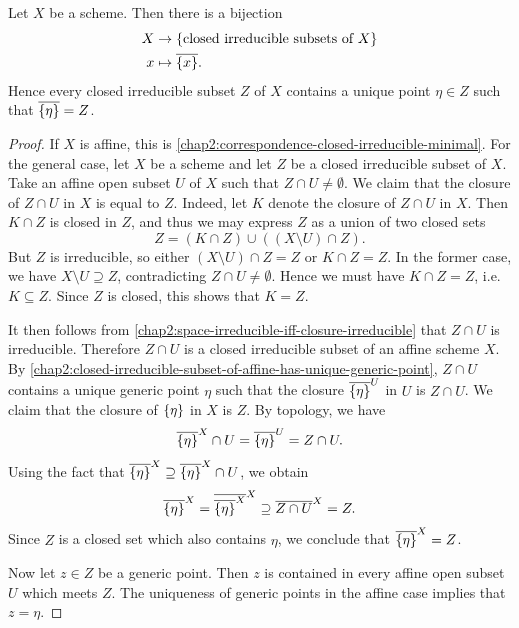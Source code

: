 \documentclass[12pt]{book}
\theoremstyle{definition}
\DeclarePairedDelimiter{\Set}{\lbrace}{\rbrace}
\begin{document}
	\begin{proposition}
		Let $X$ be a scheme. Then there is a bijection
		\begin{align*}
			X & \to \Set*{\text{closed irreducible subsets of $X$}} \\
			x & \mapsto \overline{\Set{x}}.
		\end{align*}
		Hence every closed irreducible subset $Z$ of $X$ contains a unique point $\eta \in Z$ such that $\overline{\Set{\eta}} = Z$.
	\end{proposition}
	
	\begin{proof}
		If $X$ is affine, this is \cref{chap2:correspondence-closed-irreducible-minimal}. For the general case, let $X$ be a scheme and let $Z$ be a closed irreducible subset of $X$. Take an affine open subset $U$ of $X$ such that $Z \cap U \neq \emptyset$. We claim that the closure of $Z \cap U$ in $X$ is equal to $Z$. Indeed, let $K$ denote the closure of $Z \cap U$ in $X$. Then $K \cap Z$ is closed in $Z$, and thus we may express $Z$ as a union of two closed sets
		\begin{equation*}
			Z = (K \cap Z) \cup ((X \setminus U) \cap Z).
		\end{equation*}
		But $Z$ is irreducible, so either $(X \setminus U) \cap Z = Z$ or $K \cap Z = Z$. In the former case, we have $X \setminus U \supseteq Z$, contradicting $Z \cap U \neq \emptyset$. Hence we must have $K \cap Z = Z$, i.e.~$K \subseteq Z$. Since $Z$ is closed, this shows that $K = Z$.
		
		It then follows from \cref{chap2:space-irreducible-iff-closure-irreducible} that $Z \cap U$ is irreducible. Therefore $Z \cap U$ is a closed irreducible subset of an affine scheme $X$. By \cref{chap2:closed-irreducible-subset-of-affine-has-unique-generic-point}, $Z \cap U$ contains a unique generic point $\eta$ such that the closure $\overline{\Set{\eta}}^U$ in $U$ is $Z \cap U$. We claim that the closure of $\Set{\eta}$ in $X$ is $Z$. By topology, we have
		\begin{equation*}
			\overline{\Set{\eta}}^{X} \cap U = \overline{\Set{\eta}}^{U} = Z \cap U.
		\end{equation*}
		Using the fact that $\overline{\Set{\eta}}^{X} \supseteq \overline{\Set{\eta}}^{X} \cap U$, we obtain
		\begin{equation*}
			\overline{\Set{\eta}}^X = \overline{\overline{\Set{\eta}}^{X}}^X \supseteq  \overline{Z \cap U}^X = Z.
		\end{equation*}
		Since $Z$ is a closed set which also contains $\eta$, we conclude that $\overline{\Set{\eta}}^X = Z$.
		
		Now let $z \in Z$ be a generic point. Then $z$ is contained in every affine open subset $U$ which meets $Z$. The uniqueness of generic points in the affine case implies that $z = \eta$.
	\end{proof}
	
\end{document}
